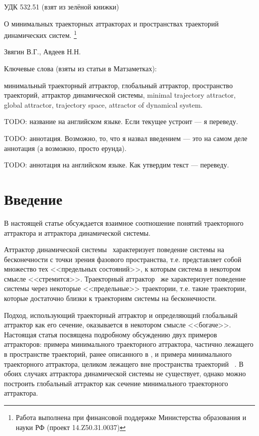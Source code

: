 \documentclass[a4paper]{article} %
\begin{document}
УДК 532.51 (взят из зелёной книжки)


О минимальных траекторных аттракторах и пространствах траекторий динамических систем.
\footnote{
	Работа выполнена при финансовой поддержке Министерства образования и науки РФ
	(проект 14.Z50.31.0037)
}

Звягин В.Г., Авдеев Н.Н.

Ключевые слова (взяты из статьи в Матзаметках):

минимальный траекторный аттрактор, глобальный аттрактор, пространство траекторий, аттрактор динамической системы,
minimal trajectory attractor, global attractor, trajectory space, attractor of dynamical system.


TODO: название на английском языке. Если текущее устроит --- я переведу.

TODO: аннотация. Возможно, то, что я назвал введением --- это на самом деле аннотация
(а возможно, просто ерунда).

TODO: аннотация на английском языке. Как утвердим текст --- переведу.


\section{Введение}
В настоящей статье обсуждается взаимное соотношение понятий траекторного аттрактора и аттрактора динамической системы.

Аттрактор динамической системы~\cite{Vishik}
характеризует поведение системы на бесконечности с точки зрения фазового пространства,
т.е. представляет собой множество тех <<предельных состояний>>, к которым система в некотором смысле <<стремится>>.
Траекторный аттрактор~\cite{Vorotnikov,Kondratyev} же характеризует поведение системы
через некоторые <<предельные>> траектории, т.е. такие траектории,
которые достаточно близки к траекториям системы на бесконечности.

Подход, использующий траекторный аттрактор и определяющий глобальный аттрактор как его сечение,
оказывается в некотором смысле <<богаче>>.
Настоящая статья посвящена подробному обсуждению двух примеров аттракторов:
примера минимального траекторного аттрактора,
частично лежащего в пространстве траекторий, ранее описанного в \cite{Zelenaya},
и примера минимального траекторного аттрактора, целиком лежащего вне пространства траекторий
~\cite{mzmZvAv,vvmshZvAv}.
В обоих случаях аттрактора динамической системы не существует,
однако можно построить глобальный аттрактор как сечение минимального траекторного аттрактора.
\end{document}
